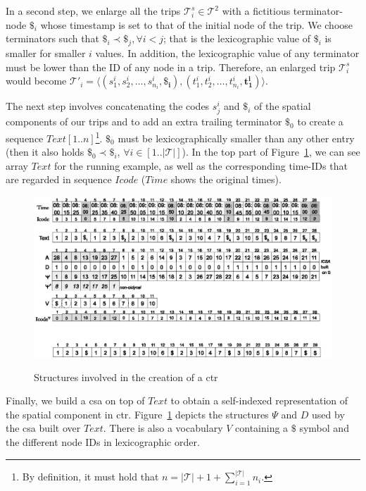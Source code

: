 	In a second step, we enlarge all the trips $\mathcal{T}^s_i \in \mathcal{T}^2$ with a fictitious terminator-node $\$_i$ whose
	timestamp is set to that of the initial node of the trip. We choose terminators such that $\$_i \prec \$_j, \forall i<j$; 
	that is the lexicographic value of $\$_i$ is smaller for smaller $i$ values. In addition, the lexicographic value
	of any terminator must be lower than the ID of any node in a trip. Therefore, an enlarged trip $\mathcal{T}^s_i$
	would become $\mathcal{T}'_i =  \langle (s^i_1, s^i_2, \dots,  s^i_{n_i}, 
	\mathbf{\$_i}),(t^i_1, t^i_2, \dots,  t^i_{n_i}, \mathbf{t^i_1}) \rangle$. 

	The next step involves concatenating the codes $s^i_j$ and $\$_i$ of the spatial components of our trips and to add an 
	extra trailing terminator $\$_0$ to create a sequence $Text[1..n]$\footnote{By definition, it must hold that $n = |\mathcal{T}| + 1 + \displaystyle\sum^{|\mathcal{T}|}_{i=1} n_i$.}. $\$_0$ must be  lexicographically 
	smaller than any other entry (then it also holds $\$_0 \prec \$_i$, $\forall i \in [1..|\mathcal{T}|]$). In the top part of
	Figure~\ref{fig:tcsa}, we can see array $Text$ for the running example, as well as the corresponding time-IDs that
	are regarded in sequence $Icode$  ($Time$ shows the original times).
	
	\begin{figure}[ht]
	  \begin{center}
	  {\includegraphics[width=1.00\textwidth]{figures/csttr.eps}}
	  \end{center}
	  \caption{Structures involved in the creation of a \acrshort{ctr}}
	  \label{fig:tcsa}
	\end{figure}

	Finally, we build a \gls{csa} on top of $Text$ to obtain a self-indexed representation of the spatial component in \gls{ctr}.
	Figure~\ref{fig:tcsa} depicts the structures $\Psi$ and $D$ used by the \gls{csa} built over $Text$. There is also a vocabulary
	$V$ containing a $\$$ symbol and the different node IDs in lexicographic order.

